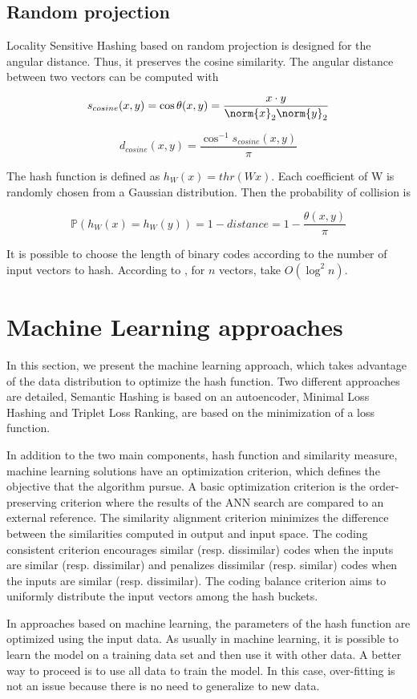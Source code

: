 \subsection{Random projection}
Locality Sensitive Hashing based on random projection \cite{charikar2002similarity} is designed for the angular distance. Thus, it preserves the cosine similarity. The angular distance between two vectors can be computed with

\[s_{cosine}(x, y)=\cos{\theta{}(x, y)}=\frac{x\cdot{}y}{\norm{x}_2\norm{y}_2}\]

\[d_{cosine}(x, y)=\frac{\cos^{-1}s_{cosine}(x, y)}{\pi}\]

The hash function is defined as $h_W(x)=thr(Wx)$. Each coefficient of W is randomly chosen from a Gaussian distribution. Then the probability of collision is 

\[\mathbb{P}(h_W(x)=h_W(y))=1-distance=1-\frac{\theta{}(x, y)}{\pi}\]

It is possible to choose the length of binary codes according to the number of input vectors to hash. According to \cite{wang2014hashing}, for $n$ vectors, take $O(\log^2{n})$.

\section{Machine Learning approaches}
In this section, we present the machine learning approach, which takes advantage of the data distribution to optimize the hash function. Two different approaches are detailed, Semantic Hashing is based on an autoencoder, Minimal Loss Hashing and Triplet Loss Ranking, are based on the minimization of a loss function.

In addition to the two main components, hash function and similarity measure, machine learning solutions have an optimization criterion, which defines the objective that the algorithm pursue. A basic optimization criterion is the order-preserving criterion where the results of the ANN search are compared to an external reference. The similarity alignment criterion minimizes the difference between the similarities computed in output and input space. The coding consistent criterion encourages similar (resp. dissimilar) codes when the inputs are similar (resp. dissimilar) and penalizes dissimilar (resp. similar) codes when the inputs are similar (resp. dissimilar). The coding balance criterion aims to uniformly distribute the input vectors among the hash buckets.

In approaches based on machine learning, the parameters of the hash function are optimized using the input data. As usually in machine learning, it is possible to learn the model on a training data set and then use it with other data. A better way to proceed is to use all data to train the model. In this case, over-fitting is not an issue because there is no need to generalize to new data.

